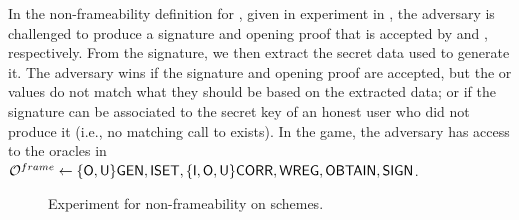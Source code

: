 In the non-frameability definition for \UAS, given in experiment \ExpNonframe in
, the adversary is challenged to produce a signature
and opening proof that is accepted by \Verify and \Judge, respectively. From
the signature, we then extract the secret data used to generate it. The
adversary wins if the signature and opening proof are accepted, but the \yeval
or \yinsp values do not match what they should be based on the extracted data;
or if the signature can be associated to the secret key of an honest user who
did not produce it (i.e., no matching call to \SIGN exists). In the game, the
adversary has access to the oracles in $\mathcal{O}^{frame} \gets
\lbrace\mathsf{O},\mathsf{U}\rbrace\mathsf{GEN},\mathsf{ISET},\lbrace\mathsf{I},\mathsf{O},\mathsf{U}\rbrace\mathsf{CORR},
\mathsf{WREG},\mathsf{OBTAIN},\mathsf{SIGN}$.

\begin{figure}[htp!]  
  \centering
  \caption{Experiment for non-frameability on \UAS schemes.}
  \label{fig:exp-uas-frame}
\end{figure}

